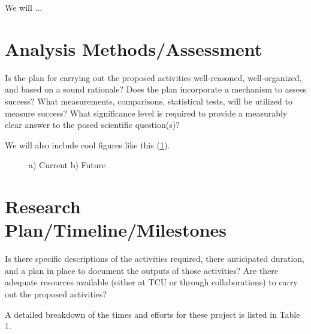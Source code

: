 \documentclass[11pt, preprint, flushrt]{aastex-numbers}
\begin{document}
We will ...

\vspace{-0.2in}
\section{Analysis Methods/Assessment}\vskip-0.05in

Is the plan for carrying out the proposed activities well-reasoned, well-organized, and based on a sound
rationale? Does the plan incorporate a mechanism to assess success?
What measurements, comparisons, statistical tests, will be utilized to
measure success?  What significance level is required to provide a
measurably clear answer to the posed scientific question(s)?   


We will also include cool figures like this (\ref{fig:figuretemp}).


\begin{figure}[\sidecaptionrelwidth] \centering
\begin{center}
\end{center}
\vskip-0.2in
\caption{\label{fig:figuretemp} \small a) Current 
b) Future
}
\end{figure}


\clearpage
\vspace{-0.2in}
\section{Research Plan/Timeline/Milestones}\vskip-0.05in

Is there specific descriptions of the activities required, there
anticipated duration, and a plan in place to document the outputs of
those activities? Are there adequate resources available (either at
TCU or through collaborations) to carry out the proposed activities? 




\vskip0.13in
\noindent A detailed breakdown of the times and efforts for these project is listed in Table 1.
\end{document}
